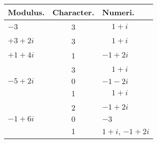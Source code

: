 \documentclass[twoside,12pt]{memoir}
\begin{document}
\begin{center}
\begin{tabular}{l|c|l}
Modulus. & Character. & Numeri. \\
\hline
\(-3\) & 3 & \(\phantom{+}1+i\) \\
\(+3+2 i\) & 3 & \(\phantom{+}1+i\) \\
\(+1+4 i\) & 1 & \(-1+2 i\) \\
 & 3 & \(\phantom{+}1+i\) \\
 \(-5+2 i\)& \(0\) & \(-1-2 i\) \\
 & 1 & \(\phantom{+}1+i\) \\
& 2 & \(-1+2 i\) \\
 \(-1+6 i\) & \(0\) & \(-3\) \\
 &1&\(1+i\), \(-1+2i\)
\end{tabular}\pagebreak%


\end{center}
\end{document}
